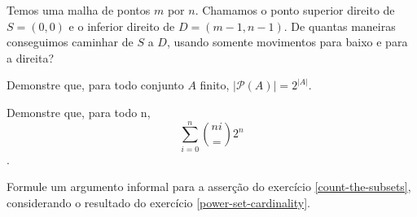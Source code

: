\begin{exercise}
Temos uma malha de pontos $m$ por $n$. Chamamos o ponto superior direito de $S = (0,0)$ e o inferior direito de $D = (m-1, n-1)$. De quantas maneiras conseguimos caminhar de $S$ a $D$, usando somente movimentos para baixo e para a direita?
\end{exercise}

\begin{exercise}
\label{power-set-cardinality}
Demonstre que, para todo conjunto $A$ finito, $|\mathcal{P}(A)| = 2^{|A|}$.
\end{exercise}

\begin{exercise}
\label{count-the-subsets}
Demonstre que, para todo n, $$\sum_{i=0}^n \binom{n i} = 2^n$$.
\end{exercise}

\begin{exercise}
Formule um argumento informal para a asserção do exercício \ref{count-the-subsets}, considerando o resultado do exercício \ref{power-set-cardinality}.
\end{exercise}

